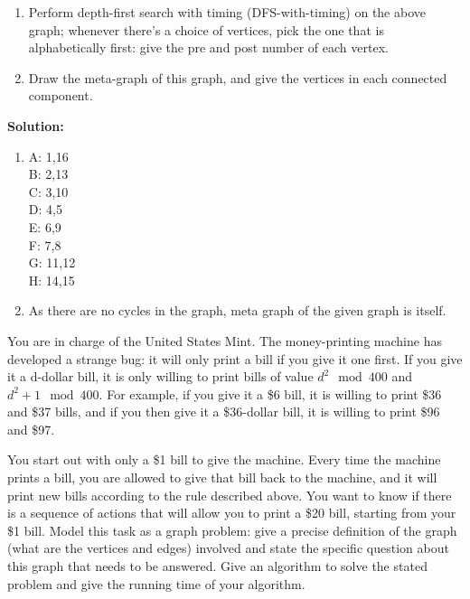 \documentclass[11pt]{article}
\begin{document}
\begin{qunlist}

\begin{enumerate}
    \item  Perform depth-first search with timing (DFS-with-timing) on the above graph; whenever there’s a choice of vertices, pick the one that is alphabetically first: give the pre and post number of each vertex.
    \item  Draw the meta-graph of this graph, and give the vertices in each connected component.
\end{enumerate}


\textbf{Solution:} 


\begin{enumerate}
    \item  A: 1,16\\
           B: 2,13\\
           C: 3,10\\
           D: 4,5\\
           E: 6,9\\
           F: 7,8\\
           G: 11,12\\
           H: 14,15
    \item  As there are no cycles in the graph, meta graph of the given graph is itself.
\end{enumerate}

You are in charge of the United States Mint. The money-printing machine has developed a strange bug: it will only print a bill if you give it one first. If you give it a d-dollar bill, it is only willing to print bills of
value $d^2 \mod 400$ and $d^2 +1 \mod 400$. For example, if you give it a \$6 bill, it is willing to print \$36 and
\$37 bills, and if you then give it a \$36-dollar bill, it is willing to print  \$96 and \$97. %

You start out with only a \$1 bill to give the machine. Every time the machine prints a bill, you are allowed to give that bill back to the machine, and it will print new bills according to the rule described above. You
want to know if there is a sequence of actions that will allow you to print a \$20 bill, starting from your \$1 bill. Model this task as a graph problem: give a precise definition of the graph (what are the vertices and edges) involved and state the specific question about this graph that needs to be answered. Give an algorithm to solve the stated problem and give the running time of your algorithm.


\end{qunlist}
\end{document}
